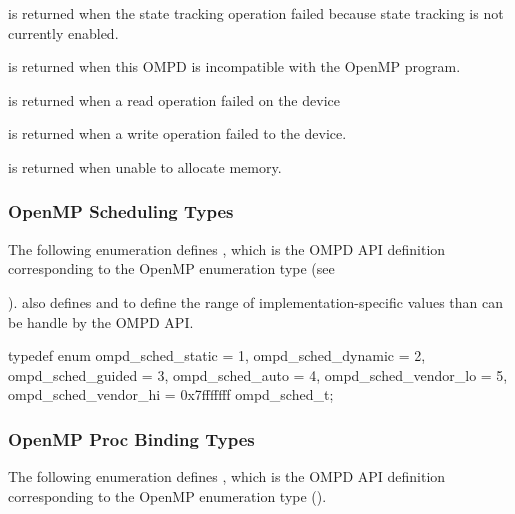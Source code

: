 \label{ompd:ompd_rc_needs_state_tracking}
 is returned when
the state tracking operation failed because state tracking is not currently enabled.

\label{ompd:ompd_rc_incompatible}
 is returned when
this OMPD is incompatible with the OpenMP program.

\label{ompd:ompd_rc_device_read_error}
 is returned when
a read operation failed on the device

\label{ompd:ompd_rc_device_write_error}
 is returned when
a write operation failed to the device.

\label{ompd:ompd_rc_nomem}
 is returned when
unable to allocate memory.

\subsubsection{OpenMP Scheduling Types}
\label{subsubsec:ompd_sched_t}

The following enumeration defines , which is the OMPD API definition 
corresponding to the OpenMP enumeration type  (see 

).
 also defines  and
 to define the range of implementation-specific 
 values than can be handle by the OMPD API.

\format

\begin{ccppspecific}
\begin{ompSyntax}
typedef enum {
  ompd_sched_static = 1,
  ompd_sched_dynamic = 2,
  ompd_sched_guided = 3,
  ompd_sched_auto = 4,
  ompd_sched_vendor_lo = 5,
  ompd_sched_vendor_hi = 0x7fffffff
} ompd_sched_t;
\end{ompSyntax}
\end{ccppspecific}


\subsubsection{OpenMP Proc Binding Types}
\label{subsubsec:ompd_proc_bind_t}

The following enumeration defines , which is the OMPD
API definition corresponding to the OpenMP enumeration type
 ().


